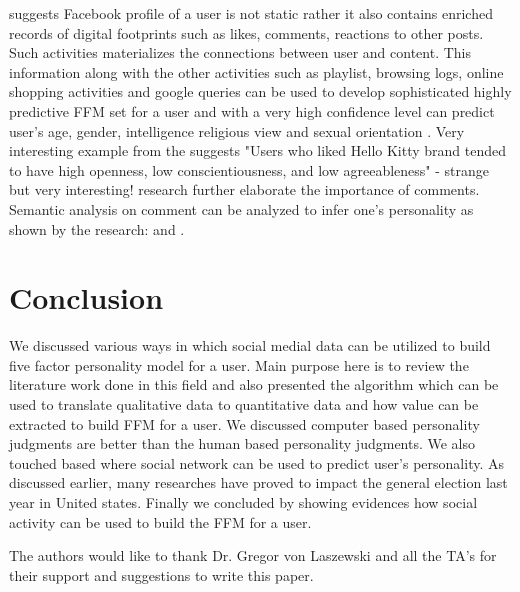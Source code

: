 \documentclass[sigconf]{acmart}
\begin{document}
\cite{ref13} suggests Facebook profile of a user is not static rather it also contains enriched records of digital footprints such as likes, comments, reactions to other posts. Such activities materializes the connections between user and content. This information along with the other activities such as playlist, browsing logs, online shopping activities and google queries can be used to develop sophisticated highly predictive FFM set for a user and with a very high confidence level can predict user’s age, gender, intelligence religious view and sexual orientation \cite{ref13}. Very interesting example from the \cite{ref13} suggests "Users who liked Hello Kitty brand tended to have high openness, low conscientiousness, and low agreeableness" - strange but very interesting! \cite{ref13} research further elaborate the importance of comments. Semantic analysis on comment can be analyzed to infer one's personality as shown by the research: \cite{ref16} and \cite{ref17}. 
 
\section{Conclusion}

We discussed various ways in which social medial data can be utilized to build five factor personality model for a user. Main purpose here is to review the literature work done in this field and also presented the algorithm which can be used to translate qualitative data to quantitative data and how value can be extracted to build FFM for a user. We discussed computer based personality judgments are better than the human based personality judgments. We also touched based where social network can be used to predict user’s personality.  As discussed earlier, many researches have proved to impact the general election last year in United states. Finally we concluded by showing evidences how social activity can be used to build the FFM for a user. 


\begin{acks}

  The authors would like to thank Dr. Gregor von Laszewski and all the TA's for their
  support and suggestions to write this paper. 

\end{acks}


 
\end{document}
